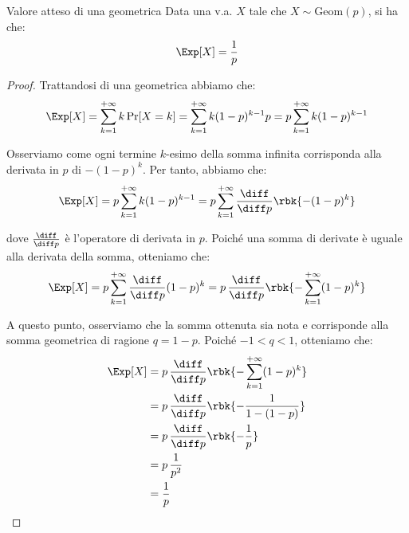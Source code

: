 \documentclass[a4paper, 12pt]{report}
\begin{document}
    \begin{framedprop}{Valore atteso di una geometrica}
        Data una v.a. $X$ tale che $X \sim \mathrm{Geom}(p)$, si ha che:
        \[\Exp[X] = \frac{1}{p}\]
    \end{framedprop}

    \begin{proof}
        Trattandosi di una geometrica abbiamo che:
        \[\begin{split}
            \Exp[X] &= \sum_{k = 1}^{+\infty} k \Pr[X = k] = \sum_{k = 1}^{+\infty} k (1-p)^{k-1} p = p \sum_{k = 1}^{+\infty} k (1-p)^{k-1}\\
        \end{split}\]

        Osserviamo come ogni termine $k$-esimo della somma infinita corrisponda alla derivata in $p$ di $-(1-p)^k$. Per tanto, abbiamo che:
        \[\begin{split}
            \Exp[X] &= p\sum_{k = 1}^{+\infty} k (1-p)^{k-1}  = p\sum_{k = 1}^{+\infty} \frac{\diff}{\diff p} \rbk{- (1-p)^{k}} \\
        \end{split}\]

        dove $\frac{\diff}{\diff p}$ è l'operatore di derivata in $p$. Poiché una somma di derivate è uguale alla derivata della somma, otteniamo che:
        \[\begin{split}
            \Exp[X] &= p\sum_{k = 1}^{+\infty} \frac{\diff}{\diff p} (1-p)^{k}  = p \, \frac{\diff}{\diff p} \rbk{- \sum_{k = 1}^{+\infty} (1-p)^{k}}  \\
        \end{split}\]

        A questo punto, osserviamo che la somma ottenuta sia nota e corrisponde alla somma geometrica di ragione $q = 1-p$. Poiché $-1 < q < 1$, otteniamo che:
        \[\begin{split}
            \Exp[X] &= p \, \frac{\diff}{\diff p} \rbk{- \sum_{k = 1}^{+\infty} (1-p)^{k}} \\
            &= p \, \frac{\diff}{\diff p} \rbk{- \frac{1}{1-(1-p)}} \\
            &= p \, \frac{\diff}{\diff p} \rbk{- \frac{1}{p}} \\
            &= p \, \frac{1}{p^2} \\
            &= \frac{1}{p} \\
        \end{split}\]
    \end{proof}
\end{document}
